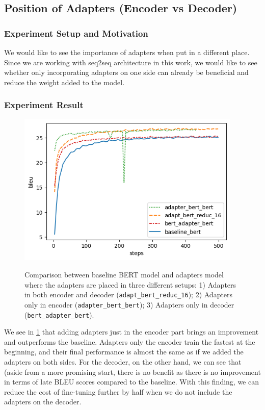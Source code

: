 \subsection{Position of Adapters (Encoder vs Decoder)}
\label{sec:posada}
\subsubsection{Experiment Setup and Motivation}
We would like to see the importance of adapters when put in a different place. Since we are working with seq2seq architecture in this work, we would like to see whether only incorporating adapters on one side can already be beneficial and reduce the weight added to the model.

\subsubsection{Experiment Result}
\begin{figure}[]
    {\includegraphics[width=0.95\textwidth]{img/bert_pos.png}}
    \centering
    \caption[Results of ablation study for adapters in the encoder or the decoder.]{Comparison between baseline BERT model and adapters model where the adapters are placed in three different setups: 1) Adapters in both encoder and decoder (\texttt{adapt\_bert\_reduc\_16}); 2) Adapters only in encoder (\texttt{adapter\_bert\_bert}); 3) Adapters only in decoder (\texttt{bert\_adapter\_bert}).}
    \label{img:adapt_bert_pos}
\end{figure}
We see in \cref{img:adapt_bert_pos} that adding adapters just in the encoder part brings an improvement and outperforms the baseline. Adapters only the encoder train the fastest at the beginning, and their final performance is almost the same as if we added the adapters on both sides. For the decoder, on the other hand, we can see that (aside from a more promising start, there is no benefit as there is no improvement in terms of late BLEU scores compared to the baseline. With this finding, we can reduce the cost of fine-tuning further by half when we do not include the adapters on the decoder.


